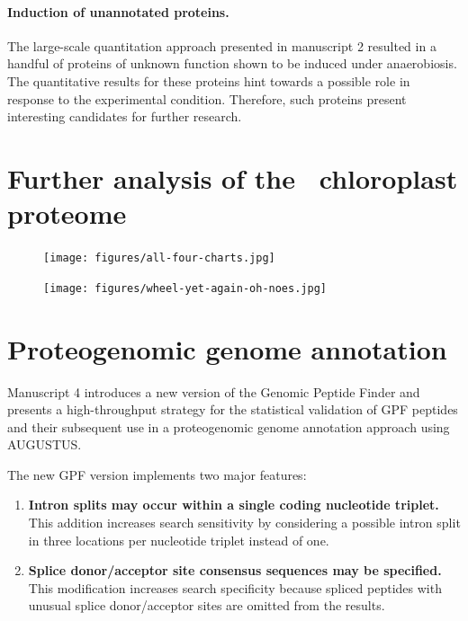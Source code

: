 \paragraph{Induction of unannotated proteins.}

The large-scale quantitation approach presented in manuscript 2 resulted
in a handful of proteins of unknown function shown to be induced under
anaerobiosis.
The quantitative results for these proteins hint towards a possible role
in response to the experimental condition.
Therefore, such proteins present interesting candidates for further research.

\section{Further analysis of the \cre~chloroplast proteome}

\begin{figure}
\texttt{[image: figures/all-four-charts.jpg]}
\caption{
}
\label{fig:mia-review-isolines}
\end{figure}

\begin{figure}
\texttt{[image: figures/wheel-yet-again-oh-noes.jpg]}
\caption{
}
\label{fig:mia-review-wheel}
\end{figure}

\section{Proteogenomic genome annotation}

Manuscript 4 introduces a new version of the Genomic Peptide Finder and
presents a high-throughput strategy for the statistical validation of
GPF peptides and their subsequent use in a proteogenomic genome annotation
approach using AUGUSTUS.

The new GPF version implements two major features:

\begin{enumerate}
\item {\bf Intron splits may occur within a single coding nucleotide triplet.}
This addition increases search sensitivity by considering a possible intron
split in three locations per nucleotide triplet instead of one.

\item {\bf Splice donor/acceptor site consensus sequences may be specified.} 
This modification increases search specificity because spliced peptides with
unusual splice donor/acceptor sites are omitted from the results.
\end{enumerate}

